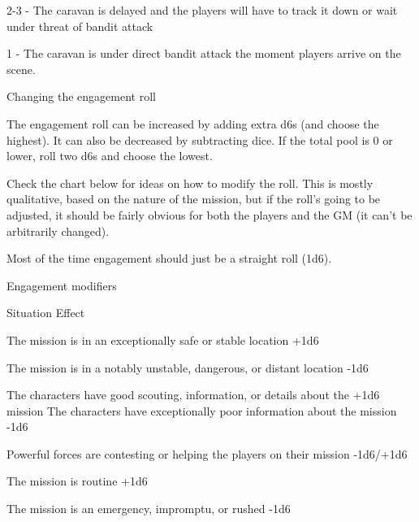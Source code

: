 2-3 - The caravan is delayed and the players will have to track it down or wait under threat of
bandit attack

1 - The caravan is under direct bandit attack the moment players arrive on the scene.


                                    Changing the engagement roll


The engagement roll can be increased by adding extra d6s (and choose the highest). It can also
be decreased by subtracting dice. If the total pool is 0 or lower, roll two d6s and choose the
lowest.


Check the chart below for ideas on how to modify the roll. This is mostly qualitative, based on
the nature of the mission, but if the roll's going to be adjusted, it should be fairly obvious for both
the players and the GM (it can't be arbitrarily changed).


Most of the time engagement should just be a straight roll (1d6).

                                         Engagement modifiers





 Situation                                                                             Effect

 The mission is in an exceptionally safe or stable location                            +1d6

 The mission is in a notably unstable, dangerous, or distant location                  -1d6

 The characters have good scouting, information, or details about the                  +1d6
 mission
 The characters have exceptionally poor information about the mission                  -1d6

 Powerful forces are contesting or helping the players on their mission                -1d6/+1d6

 The mission is routine                                                                +1d6

 The mission is an emergency, impromptu, or rushed                                     -1d6

